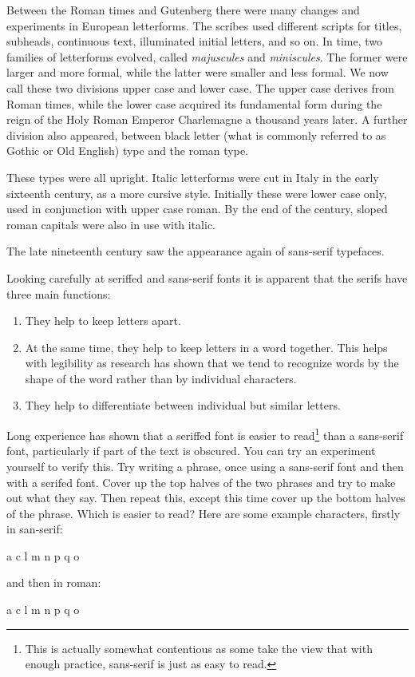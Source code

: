 \documentclass[10pt,letterpaper]{memoir}
\begin{document}
    Between the Roman times and Gutenberg there were many changes and
experiments in European letterforms. The scribes used different scripts
for titles, subheads, continuous text, illuminated initial letters, and so
on. In time, two families of letterforms evolved, called \emph{majuscules}
and \emph{miniscules}. The former were larger and more formal, while the latter
were smaller and less formal. We now call these two divisions upper case and
lower case. The upper case derives from Roman times, while the lower case
acquired its fundamental form during the reign of the Holy Roman Emperor
Charlemagne a thousand years later.
A further division also appeared, between black letter (what is
commonly referred to as Gothic or Old English) type and the roman type.

    These types were all upright. Italic letterforms were cut in Italy
in the early sixteenth century, as a more cursive style. Initially these were
lower case only, used in conjunction with upper case roman. By the end of
the century, sloped roman capitals were also in use with italic.

    The late nineteenth century saw the appearance again of sans-serif
typefaces.

    Looking carefully at seriffed and sans-serif fonts it is apparent that
the serifs have three main functions:
\begin{enumerate}
\item They help to keep letters apart.
\item At the same time, they help to keep letters in a word together. This
  helps with legibility as research has shown that we tend to recognize
  words by the shape of the word rather than by individual characters.
\item They help to differentiate between individual but similar letters.
\end{enumerate}

Long experience has shown that a seriffed font is easier to 
read\footnote{This is actually somewhat contentious as some take the view
that with enough practice, sans-serif is just as easy to read.}
than a
sans-serif font, particularly if part of the text is obscured. You can
try an experiment yourself to verify this. Try writing a phrase, once
using a sans-serif font and then with a serifed font. Cover up
the top halves of the two phrases and try to make out what they say. Then
repeat this, except this time cover up the bottom halves of the phrase.
Which is easier to read? Here are some example characters, firstly in san-serif:
\begin{center}
{\Huge\sffamily a c l m n p q o}
\end{center}
and then in roman:
\begin{center}
{\Huge a c l m n p q o}
\end{center}
\end{document}
